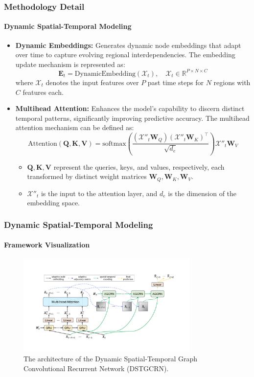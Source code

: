 \documentclass[light]{lutbeamer} %
\begin{document}
\begin{frame}
    \frametitle{Methodology Detail}
    \framesubtitle{Dynamic Spatial-Temporal Modeling}
    \begin{itemize}
        \item \textbf{Dynamic Embeddings:}
              Generates dynamic node embeddings that adapt over time to capture evolving regional interdependencies. The embedding update mechanism is represented as:
              \[
                  \bm{E}_t = \text{DynamicEmbedding}(\bm{\mathcal{X}}_t), \quad \bm{\mathcal{X}}_t \in \mathbb{R}^{P \times N \times C}
              \]
              where \( \bm{\mathcal{X}}_t \) denotes the input features over \( P \) past time steps for \( N \) regions with \( C \) features each.

        \item \textbf{Multihead Attention:}
              Enhances the model's capability to discern distinct temporal patterns, significantly improving predictive accuracy. The multihead attention mechanism can be defined as:
              \[
                  \text{Attention}(\mathbf{Q}, \mathbf{K}, \mathbf{V}) = \text{softmax}\left(\frac{(\bm{\mathcal{X}}''_t \bm{W}_Q)(\bm{\mathcal{X}}''_t \bm{W}_K)^\top}{\sqrt{d_e}}\right)\bm{\mathcal{X}}''_t \bm{W}_V
              \]
              \begin{itemize}
                  \item \(\mathbf{Q}, \mathbf{K}, \mathbf{V}\) represent the queries, keys, and values, respectively, each transformed by distinct weight matrices \(\bm{W}_Q, \bm{W}_K, \bm{W}_V\).
                  \item \( \bm{\mathcal{X}}''_t \) is the input to the attention layer, and \( d_e \) is the dimension of the embedding space.
              \end{itemize}
    \end{itemize}
\end{frame}

\begin{frame}
    \frametitle{Dynamic Spatial-Temporal Modeling}
    \framesubtitle{Framework Visualization}
    \begin{figure}
        \centering
        \includegraphics[width=0.8\textwidth]{figures/dstgcrn_framework.pdf}
        \caption{The architecture of the Dynamic Spatial-Temporal Graph Convolutional Recurrent Network (DSTGCRN).}
    \end{figure}
\end{frame}
\end{document}
